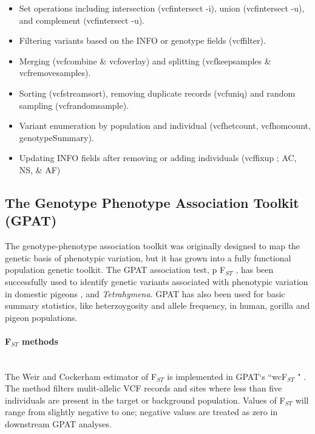 \documentclass[10pt,letterpaper]{article}
\begin{document}
\begin{itemize}
\item Set operations including intersection (vcfintersect -i), union (vcfintersect -u), and complement (vcfintersect -u).
\item Filtering variants based on the INFO or genotype fields (vcffilter).  
\item Merging (vcfcombine \& vcfoverlay) and splitting (vcfkeepsamples \& vcfremovesamples). 
\item Sorting (vcfstreamsort), removing duplicate records (vcfuniq) and random sampling (vcfrandomsample).
\item Variant enumeration by population and individual  (vcfhetcount, vcfhomcount, genotypeSummary).
\item Updating INFO fields after removing or adding individuals (vcffixup ; AC, NS, \& AF)
\end{itemize}




\subsection*{The Genotype Phenotype Association Toolkit (GPAT)}

The genotype-phenotype association toolkit was originally designed to map the genetic basis of phenotypic variation, but it has grown into a fully functional population genetic toolkit.  The GPAT association test, p F$_{ST}$ , has been successfully used to identify genetic variants associated with phenotypic variation in domestic pigeons
 \cite{color, muff},  and \textit{Tetrahymena}\cite{tet}.  GPAT has also been used for basic summary statistics, like heterzoygosity and allele frequency, in human\cite{iron}, gorilla and pigeon\cite{pigeon} populations.




\paragraph*{ F$_{ST}$  methods} \mbox{} \\

The Weir and Cockerham estimator of F$_{ST}$ is implemented in GPAT`s ``wcF$_{ST}$ " \cite{fst}.  The method filters mulit-allelic VCF records and sites where less than five individuals are present in the target or background population. Values of F$_{ST}$ will range from slightly negative to one; negative values are treated as zero in downstream GPAT analyses. 
\end{document}
